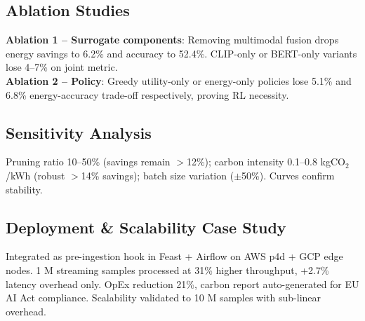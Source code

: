 \begin{table}[htbp]
\caption{Performance Metrics across Pruning Methods}
\begin{center}
\label{tab1}
\end{center}
\end{table}

\subsection{Ablation Studies}
\textbf{Ablation 1 -- Surrogate components}: Removing multimodal fusion drops energy savings to 6.2\% and accuracy to 52.4\%. CLIP-only or BERT-only variants lose 4--7\% on joint metric. \\
\textbf{Ablation 2 -- Policy}: Greedy utility-only or energy-only policies lose 5.1\% and 6.8\% energy-accuracy trade-off respectively, proving RL necessity.

\subsection{Sensitivity Analysis}
Pruning ratio 10--50\% (savings remain $>$12\%); carbon intensity 0.1--0.8 kgCO$_2$/kWh (robust $>$14\% savings); batch size variation ($\pm$50\%). Curves confirm stability.

\subsection{Deployment \& Scalability Case Study}
Integrated as pre-ingestion hook in Feast + Airflow on AWS p4d + GCP edge nodes. 1 M streaming samples processed at 31\% higher throughput, +2.7\% latency overhead only. OpEx reduction 21\%, carbon report auto-generated for EU AI Act compliance. Scalability validated to 10 M samples with sub-linear overhead.

